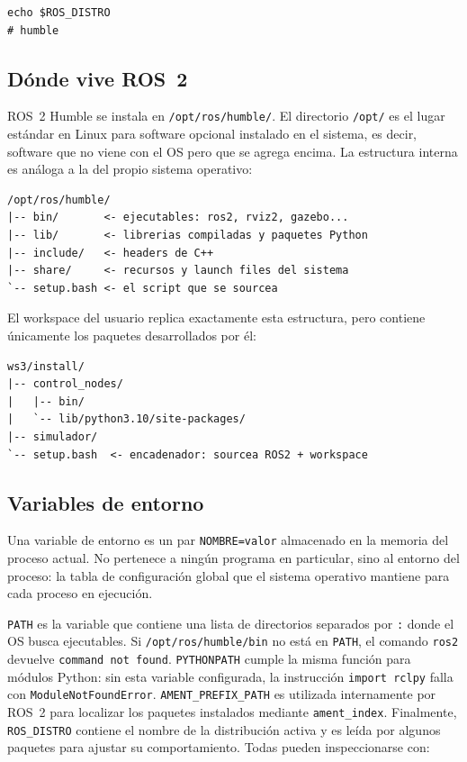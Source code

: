 \begin{lstlisting}[style=bash, caption={Verificación de la distribución activa.}]
echo $ROS_DISTRO
# humble
\end{lstlisting}

\subsection{Dónde vive ROS~2}

ROS~2 Humble se instala en \texttt{/opt/ros/humble/}. El directorio \texttt{/opt/} es el lugar estándar en Linux para software opcional instalado en el sistema, es decir, software que no viene con el OS pero que se agrega encima. La estructura interna es análoga a la del propio sistema operativo:

\begin{lstlisting}[style=bash, caption={Estructura de instalación de ROS~2 Humble.}]
/opt/ros/humble/
|-- bin/       <- ejecutables: ros2, rviz2, gazebo...
|-- lib/       <- librerias compiladas y paquetes Python
|-- include/   <- headers de C++
|-- share/     <- recursos y launch files del sistema
`-- setup.bash <- el script que se sourcea
\end{lstlisting}

El workspace del usuario replica exactamente esta estructura, pero contiene únicamente los paquetes desarrollados por él:

\begin{lstlisting}[style=bash, caption={Estructura del workspace tras compilar con \texttt{colcon build}.}]
ws3/install/
|-- control_nodes/
|   |-- bin/
|   `-- lib/python3.10/site-packages/
|-- simulador/
`-- setup.bash  <- encadenador: sourcea ROS2 + workspace
\end{lstlisting}

\subsection{Variables de entorno}

Una variable de entorno es un par \texttt{NOMBRE=valor} almacenado en la memoria del proceso actual. No pertenece a ningún programa en particular, sino al entorno del proceso: la tabla de configuración global que el sistema operativo mantiene para cada proceso en ejecución.

\texttt{PATH} es la variable que contiene una lista de directorios separados por \texttt{:} donde el OS busca ejecutables. Si \texttt{/opt/ros/humble/bin} no está en \texttt{PATH}, el comando \texttt{ros2} devuelve \texttt{command not found}. \texttt{PYTHONPATH} cumple la misma función para módulos Python: sin esta variable configurada, la instrucción \texttt{import rclpy} falla con \texttt{ModuleNotFoundError}. \texttt{AMENT\_PREFIX\_PATH} es utilizada internamente por ROS~2 para localizar los paquetes instalados mediante \texttt{ament\_index}. Finalmente, \texttt{ROS\_DISTRO} contiene el nombre de la distribución activa y es leída por algunos paquetes para ajustar su comportamiento. Todas pueden inspeccionarse con:


